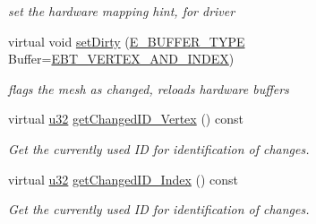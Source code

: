 \begin{DoxyCompactItemize}
\begin{DoxyCompactList}\small\item\em set the hardware mapping hint, for driver \end{DoxyCompactList}\item 
\mbox{\label{classirr_1_1scene_1_1CMeshBuffer_a7afead32226650c724f13f6f61282810}} 
virtual void \hyperlink{classirr_1_1scene_1_1CMeshBuffer_a7afead32226650c724f13f6f61282810}{set\+Dirty} (\hyperlink{namespaceirr_1_1scene_a8f59a89ffef0ad8e5b2c2cb874a93e8c}{E\+\_\+\+B\+U\+F\+F\+E\+R\+\_\+\+T\+Y\+PE} Buffer=\hyperlink{namespaceirr_1_1scene_a8f59a89ffef0ad8e5b2c2cb874a93e8ca833624730c30cffccc121fe31aa0832c}{E\+B\+T\+\_\+\+V\+E\+R\+T\+E\+X\+\_\+\+A\+N\+D\+\_\+\+I\+N\+D\+EX})
\begin{DoxyCompactList}\small\item\em flags the mesh as changed, reloads hardware buffers \end{DoxyCompactList}\item 
virtual \hyperlink{namespaceirr_a0416a53257075833e7002efd0a18e804}{u32} \hyperlink{classirr_1_1scene_1_1CMeshBuffer_a99abc7d5f5a9f34221c58a598b33ce3a}{get\+Changed\+I\+D\+\_\+\+Vertex} () const
\begin{DoxyCompactList}\small\item\em Get the currently used ID for identification of changes. \end{DoxyCompactList}\item 
virtual \hyperlink{namespaceirr_a0416a53257075833e7002efd0a18e804}{u32} \hyperlink{classirr_1_1scene_1_1CMeshBuffer_aec6786022abd81ddf8d4e79a23628944}{get\+Changed\+I\+D\+\_\+\+Index} () const
\begin{DoxyCompactList}\small\item\em Get the currently used ID for identification of changes. \end{DoxyCompactList}\end{DoxyCompactItemize}
